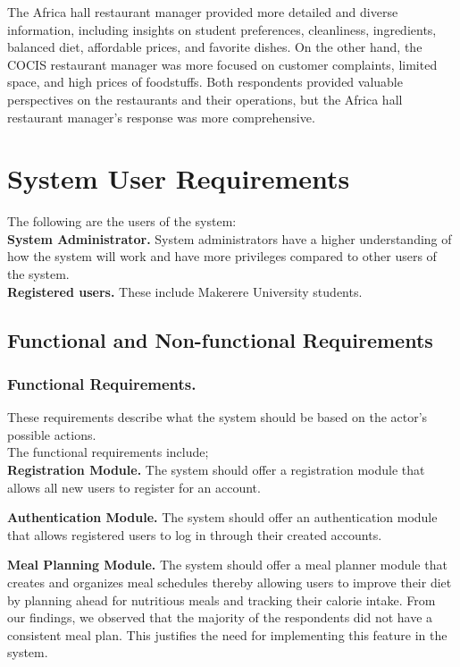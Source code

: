 \documentclass{article}
\begin{document}
\noindent
The Africa hall restaurant manager provided more detailed and diverse information, including insights on student preferences, cleanliness, ingredients, balanced diet, affordable prices, and favorite dishes. On the other hand, the COCIS restaurant manager
was more focused on customer complaints, limited space, and high prices of foodstuffs. Both respondents provided valuable perspectives on the restaurants and their operations, but the Africa hall restaurant manager's response was more comprehensive.

\newpage
\section{System User Requirements}
The following are the users of the system:\\
\textbf{System Administrator.} System administrators have a higher understanding of how the system will work and have more privileges compared to other users of the system.\\
\textbf{Registered users.} These include Makerere University students.

\subsection{Functional and Non-functional Requirements}
\subsubsection{Functional Requirements.}
These requirements describe what the system should be based on the actor’s possible actions.\\
The functional requirements include;\\
\textbf{Registration Module.} The system should offer a registration module that allows all new users to register for an account.

\noindent
\textbf{Authentication Module.} The system should offer an authentication module that allows registered users to log in through their created accounts.

\noindent
\textbf{Meal Planning Module.} The system should offer a meal planner module that creates and organizes meal schedules thereby allowing users to improve their diet by planning ahead for nutritious meals and tracking their calorie intake. From our findings, we observed that the majority of the respondents did not have a consistent meal plan. This justifies the need for implementing this feature in the system.
\end{document}

